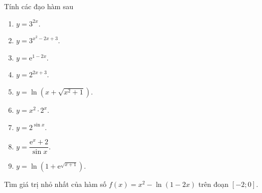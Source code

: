 \begin{bt}%
Tính các đạo hàm sau
\begin{enumerate}
        \item $y=3^{2x}$.
        \item $y=3^{x^2-2x+3}$.
        \item $y=\mathrm{e}^{1-2x}$.
        \item $y=2^{2x+3}$.
        \item $y=\ln \left(x+\sqrt{x^2+1}\right)$.
        \item $y=x^2\cdot 2^x$.
        \item $y=2^{\sin x}$.
        \item $y=\dfrac{\mathrm{e}^x+2}{\sin x}$.
        \item $y=\ln \left( 1+\mathrm{e}^{\sqrt{x+1}}\right)$.
    \end{enumerate}
\end{bt}
\begin{bt}%
Tìm giá trị nhỏ nhất của hàm số $f(x)=x^2-\ln(1-2x)$ trên đoạn $[-2;0]$. 
\end{bt}

